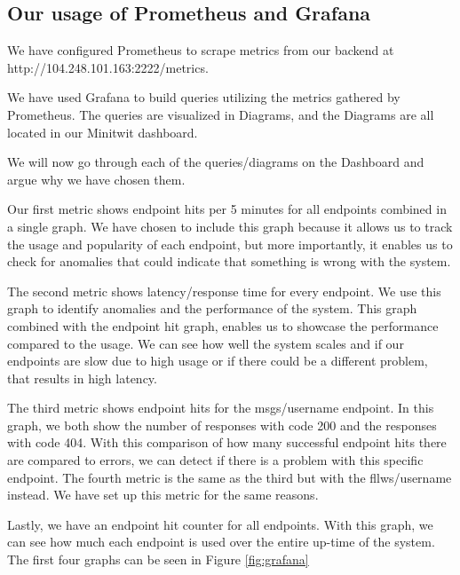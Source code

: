 \subsection{Our usage of Prometheus and Grafana}
We have configured Prometheus to scrape metrics from our backend at http://104.248.101.163:2222/metrics. \newline

\noindent We have used Grafana to build queries utilizing the metrics gathered by Prometheus. The queries are visualized in Diagrams, and the Diagrams are all located in our Minitwit dashboard. \newline

\noindent We will now go through each of the queries/diagrams on the Dashboard and argue why we have chosen them. \newline

Our first metric shows endpoint hits per 5 minutes for all endpoints combined in a single graph. We have chosen to include this graph because it allows us to track the usage and popularity of each endpoint, but more importantly, it enables us to check for anomalies that could indicate that something is wrong with the system. \newline

\noindent The second metric shows latency/response time for every endpoint. We use this graph to identify anomalies and the performance of the system. This graph combined with the endpoint hit graph, enables us to showcase the performance compared to the usage. We can see how well the system scales and if our endpoints are slow due to high usage or if there could be a different problem, that results in high latency. \newline

\noindent The third metric shows endpoint hits for the msgs/username endpoint. In this graph, we both show the number of responses with code 200 and the responses with code 404. With this comparison of how many successful endpoint hits there are compared to errors, we can detect if there is a problem with this specific endpoint.
The fourth metric is the same as the third but with the fllws/username instead. We have set up this metric for the same reasons. \newline

Lastly, we have an endpoint hit counter for all endpoints. With this graph, we can see how much each endpoint is used over the entire up-time of the system. The first four graphs can be seen in Figure \ref{fig:grafana}

